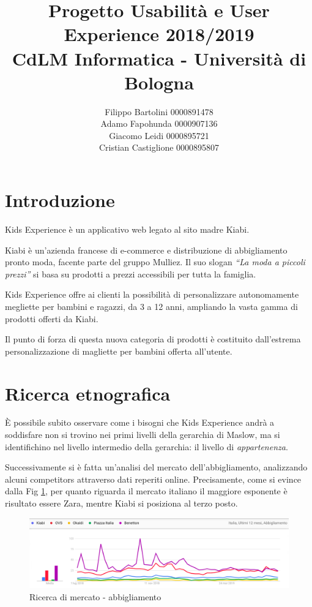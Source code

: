 \documentclass[12pt,italian,]{report}
\title{Progetto Usabilità e User Experience 2018/2019\\[0.8em]\large CdLM Informatica - Università di Bologna}
\author{Filippo Bartolini 0000891478 \\ Adamo Fapohunda 0000907136\\ Giacomo Leidi 0000895721 \\ Cristian Castiglione 0000895807}
\date{}
\begin{document}
\maketitle

{
\setcounter{tocdepth}{2}
\tableofcontents
}
\newpage
\section{Introduzione}\label{introduzione}
Kids Experience è un applicativo web legato al sito madre Kiabi.

Kiabi è un'azienda francese di e-commerce e distribuzione di
abbigliamento pronto moda, facente parte del gruppo Mulliez. Il suo
slogan \emph{``La moda a piccoli prezzi''} si basa su prodotti a prezzi
accessibili per tutta la famiglia.

Kids Experience offre ai clienti la possibilità di personalizzare
autonomamente megliette per bambini e ragazzi, da 3 a 12 anni, ampliando la vasta gamma di prodotti offerti da Kiabi.

Il punto di forza di questa nuova categoria di prodotti è costituito dall'estrema personalizzazione di magliette per bambini offerta all'utente.

\section{Ricerca etnografica}\label{ricerca-etnografica}
È possibile subito osservare come i bisogni che Kids Experience andrà a soddisfare non si trovino nei primi livelli della gerarchia di Maslow, ma si identifichino nel livello intermedio della gerarchia: il livello
di \emph{appartenenza}.

Successivamente si è fatta un'analisi del mercato dell'abbigliamento, analizzando alcuni competitors attraverso dati reperiti online.
Precisamente, come si evince dalla Fig \ref{abbigliamo_generico}, per quanto riguarda il
mercato italiano il maggiore esponente è risultato essere Zara, mentre Kiabi si posiziona al terzo posto.

\begin{figure}[h]
\centering
\includegraphics{img/abbigliamento_generico.png}
\caption{Ricerca di mercato - abbigliamento}
\label{abbigliamo_generico}
\end{figure}
\end{document}
